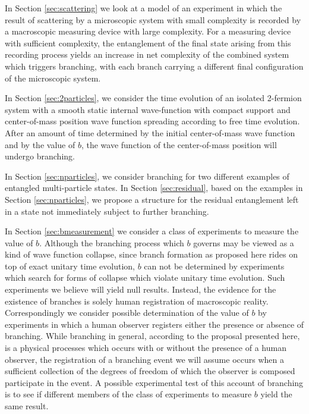 \documentclass[twocolumn,amsmath,amssymb]{revtex4-1}
\begin{document}
In Section \ref{sec:scattering} we look at
a model of an experiment in which the result of scattering by a microscopic system 
with small complexity
is recorded by a macroscopic measuring device with large complexity.
For a measuring device with sufficient complexity, the entanglement 
of the final state arising from this recording process yields
an increase in net complexity of the combined system which 
triggers branching, with each branch carrying a different final configuration
of the microscopic system.

In Section \ref{sec:2particles}, we consider
the time evolution of an isolated 2-fermion system with
a smooth static internal wave-function with compact support and
center-of-mass position wave function spreading according to free time evolution.
After an amount of time determined by the initial center-of-mass wave function
and by the value of $b$,
the wave function of the center-of-mass position will undergo branching. 

In Section \ref{sec:nparticles},
we consider branching 
for two different examples of entangled multi-particle states.
In Section \ref{sec:residual},
based on the examples in Section \ref{sec:nparticles}, we propose
a structure for the residual
entanglement left in a state not immediately subject to further branching.

In Section \ref{sec:bmeasurement} we consider
a class of experiments to measure the value of $b$.
Although the branching
process which $b$ governs may be viewed as a kind of wave function
collapse, since branch formation as proposed here rides on top of exact
unitary time evolution, $b$ can not be determined by
experiments which search for forms of collapse which violate
unitary time evolution.
Such experiments we believe will yield null results.
Instead, the evidence for the existence of branches is
solely human registration of macroscopic reality.
Correspondingly we consider possible
determination of the value of $b$
by experiments
in which
a human observer registers 
either the presence or absence of branching.
While
branching in general, according to the proposal
presented here, is a physical processes which
occurs with or without the presence of a human
observer,
the registration of a branching
event we will assume occurs when a
sufficient collection of
the degrees of freedom of which
the observer is composed
participate in the event.
A possible experimental test of this account of branching
is to see if different
members of the class of experiments to measure $b$
yield the same result.
\end{document}
